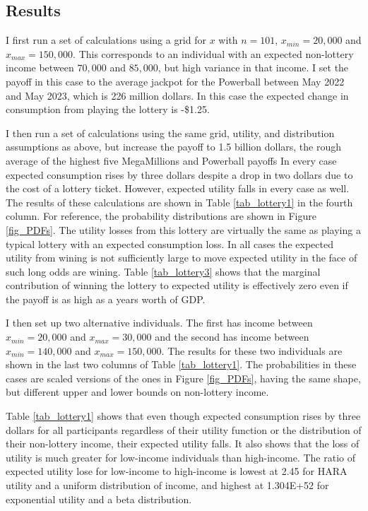 \documentclass[letterpaper,12pt]{article}
\numberwithin{equation}{section}
\numberwithin{figure}{section}
\numberwithin{table}{section}
\begin{document}
\begin{spacing}{1.5}
\section{Results} \label{sec_results}

	I first run a set of calculations using a grid for $x$ with $n=101$, $x_{min} = 20,000$ and $x_{max} = 150,000$.  This corresponds to an individual with an expected non-lottery income between $70,000$ and $85,000$, but high variance in that income.  I set the payoff in this case to the average jackpot for the Powerball between May 2022 and May 2023, which is 226 million dollars.  In this case the expected change in consumption from playing the lottery is -\$1.25.

	I then run a set of calculations using the same grid, utility, and distribution assumptions as above, but increase the payoff to 1.5 billion dollars, the rough average of the highest five MegaMillions and Powerball payoffs  In every case expected consumption rises by three dollars despite a drop in two dollars due to the cost of a lottery ticket.  However, expected utility falls in every case as well.  The results of these calculations are shown in Table \ref{tab_lottery1} in the fourth column.  For reference, the probability distributions are shown in Figure \ref{fig_PDFs}.  The utility losses from this lottery are virtually the same as playing a typical lottery with an expected consumption loss.  In all cases the expected utility from wining is not sufficiently large to move expected utility in the face of such long odds are wining.  Table \ref{tab_lottery3} shows that the marginal contribution of winning the lottery to expected utility is effectively zero even if the payoff is as high as a years worth of GDP.

	I then set up two alternative individuals.  The first has income between $x_{min} = 20,000$ and $x_{max} = 30,000$ and the second has income between $x_{min} = 140,000$ and $x_{max} = 150,000$.  The results for these two individuals are shown in the last two columns of Table \ref{tab_lottery1}.  The probabilities in these cases are scaled versions of the ones in Figure \ref{fig_PDFs}, having the same shape, but different upper and lower bounds on non-lottery income.

	Table \ref{tab_lottery1} shows that even though expected consumption rises by three dollars for all participants regardless of their utility function or the distribution of their non-lottery income, their expected utility falls.  It also shows that the loss of utility is much greater for low-income individuals than high-income.  The ratio of expected utility lose for low-income to high-income is lowest at 2.45 for HARA utility and a uniform distribution of income, and highest at 1.304E+52 for exponential utility and a beta distribution.


\end{spacing}
\end{document}

